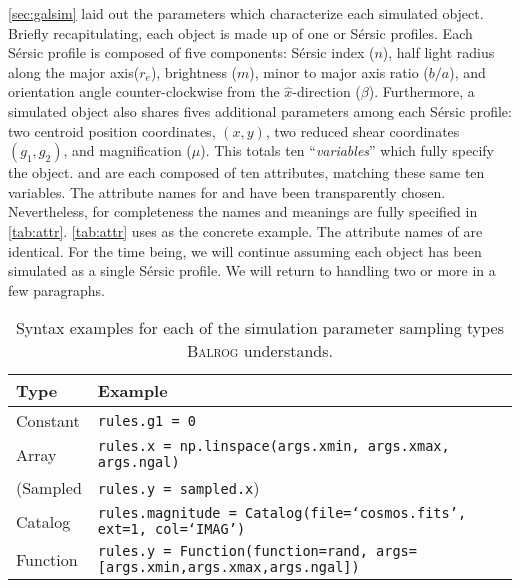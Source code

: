 \documentclass[11pt]{book}
\newcommand{\codett}[1]{\texttt{#1}}
\newcommand{\balrog}{\textsc{Balrog}}
\newcommand{\sersic}{S\'{e}rsic}
\begin{document}
\autoref{sec:galsim} laid out the parameters which characterize each simulated object.
Briefly recapitulating, each object is made up of one or \sersic{} profiles.
Each \sersic{} profile is composed of five components: 
\sersic{} index ($n$), half light radius along the major axis($r_e$), brightness ($m$), minor to major axis ratio ($b/a$), 
and orientation angle counter-clockwise from the $\hat{x}$-direction ($\beta$).
Furthermore, a simulated object also shares fives additional parameters among each \sersic{} profile:
two centroid position coordinates, $(x,y)$, two reduced shear coordinates $(g_1,g_2)$, and magnification ($\mu$).
This totals ten ``\emph{variables}'' which fully specify the object.
\simrules{} and \simsamp{} are each composed of ten attributes,
matching these same ten variables.
The attribute names for \simrules{} and \simsamp{} have been transparently chosen.
Nevertheless, for completeness the names and meanings are fully specified in \autoref{tab:attr}.
\autoref{tab:attr} uses \simrules{} as the concrete example.
The attribute names of \simsamp{} are identical. 
For the time being, we will continue assuming each object has been simulated as a single \sersic{} profile.
We will return to handling two or more in a few paragraphs.

\begin{table} 
\caption{Syntax examples for each of the simulation parameter sampling types \balrog{} understands.} \label{tab:simtype}
\begin{tabular} {l l}
\toprule %
\rowcolor{gray2} \textbf{Type} & \textbf{Example} \\ \midrule
Constant & \codett{rules.g1 = 0} \\
Array & \codett{rules.x =  np.linspace(args.xmin, args.xmax, args.ngal)} \\
(Sampled  & \codett{rules.y = sampled.x}) \\
Catalog & \codett{rules.magnitude = Catalog(file=`cosmos.fits', ext=1, col=`IMAG')} \\
Function & \codett{rules.y = Function(function=rand, args=[args.xmin,args.xmax,args.ngal])} \\ \bottomrule %
\end{tabular}
\end{table}
\end{document}

